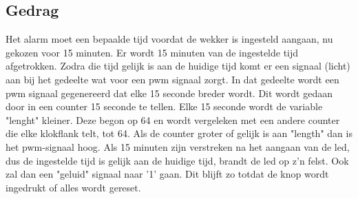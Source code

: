 \subsection{Gedrag}
Het alarm moet een bepaalde tijd voordat de wekker is ingesteld aangaan, nu gekozen voor 15 minuten.
Er wordt 15 minuten van de ingestelde tijd afgetrokken. Zodra die tijd gelijk is aan de huidige tijd komt er een signaal (licht) aan bij het gedeelte wat voor een pwm signaal zorgt.
In dat gedeelte wordt een pwm signaal gegenereerd dat elke 15 seconde breder wordt. Dit wordt gedaan door in een counter 15 seconde te tellen. Elke 15 seconde wordt de variable "lenght" kleiner. Deze begon op 64 en wordt vergeleken met een andere counter die elke klokflank telt, tot 64. Als de counter groter of gelijk is aan "length" dan is het pwm-signaal hoog. 
Als 15 minuten zijn verstreken na het aangaan van de led, dus de ingestelde tijd is gelijk aan de huidige tijd, brandt de led op z'n felst. Ook zal dan een "geluid" signaal naar '1' gaan. Dit blijft zo totdat de knop wordt ingedrukt of alles wordt gereset.